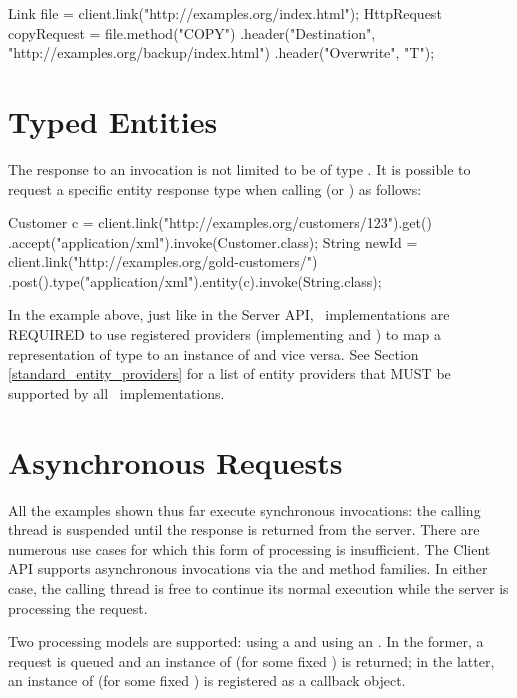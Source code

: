 \begin{listing}{1}
Link file = client.link("http://examples.org/index.html");
HttpRequest copyRequest = file.method("COPY") 
    .header("Destination", "http://examples.org/backup/index.html")
    .header("Overwrite", "T");
\end{listing}

\section{Typed Entities}

The response to an invocation is not limited to be of type \HttpResponse. It is possible to request a specific entity response type when calling  (or ) as follows:

\begin{listing}{1}
Customer c = client.link("http://examples.org/customers/123").get()
    .accept("application/xml").invoke(Customer.class);
String newId = client.link("http://examples.org/gold-customers/")
    .post().type("application/xml").entity(c).invoke(String.class);
\end{listing}

In the example above, just like in the Server API, \jaxrs\ implementations are REQUIRED to use registered providers (implementing  and ) to map a representation of type  to an instance of  and vice versa. See Section \ref{standard_entity_providers} for a list of entity providers that MUST be supported by all \jaxrs\ implementations.

\section{Asynchronous Requests}

All the examples shown thus far execute synchronous invocations: the calling thread is suspended until the response is returned from the server. There are numerous use cases for which this form of processing is insufficient. The Client API supports asynchronous invocations via the  and  method families. In either case, the calling thread is free to continue its normal execution while the server is processing the request. 

Two processing models are supported: using a  and using an . In the former, a request is queued and an instance of  (for some fixed ) is returned; in the latter, an instance of  (for some fixed ) is registered as a callback object.

